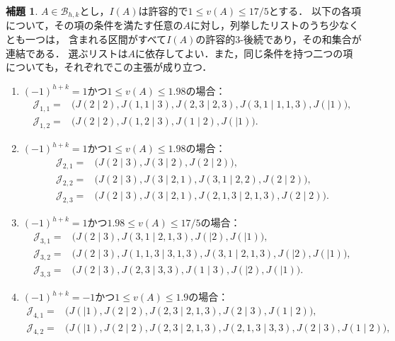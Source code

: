 \documentclass[10pt,a4paper]{ujarticle}
\theoremstyle{definition}
\newtheorem{lemma}{補題}
\begin{document}
\begin{lemma}
  \label{Lem2}
  $A\in\mathcal{B}_{h,k}$とし，$I(A)$は許容的で$1\le v(A)\le17/5$とする．
  以下の各項について，その項の条件を満たす任意の$A$に対し，列挙したリストのうち少なくとも一つは，
  含まれる区間がすべて$I(A)$の許容的$3$-後続であり，その和集合が連結である．
  選ぶリストは$A$に依存してよい．また，同じ条件を持つ二つの項についても，それぞれでこの主張が成り立つ．
  \begin{enumerate}
    \item \label{Lem2:family1} $(-1)^{h+k}=1$かつ$1\le v(A)\le1.98$の場合：
    \[
      \begin{aligned}
        \mathcal{J}_{1,1}={}&\bigl(J(2\mid 2), J(1,1\mid 3), J(2,3\mid 2,3), J(3,1\mid 1,1,3), J(\mid 1)\bigr),\\
        \mathcal{J}_{1,2}={}&\bigl(J(2\mid 2), J(1,2\mid 3), J(1\mid 2), J(\mid 1)\bigr).
      \end{aligned}
    \]
    \item \label{Lem2:family2} $(-1)^{h+k}=1$かつ$1\le v(A)\le1.98$の場合：
    \[
      \begin{aligned}
        \mathcal{J}_{2,1}={}&\bigl(J(2\mid 3), J(3\mid 2), J(2\mid 2)\bigr),\\
        \mathcal{J}_{2,2}={}&\bigl(J(2\mid 3), J(3\mid 2,1), J(3,1\mid 2,2), J(2\mid 2)\bigr),\\
        \mathcal{J}_{2,3}={}&\bigl(J(2\mid 3), J(3\mid 2,1), J(2,1,3\mid 2,1,3), J(2\mid 2)\bigr).
      \end{aligned}
    \]
    \item \label{Lem2:family3} $(-1)^{h+k}=1$かつ$1.98\le v(A)\le17/5$の場合：
    \[
      \begin{aligned}
        \mathcal{J}_{3,1}={}&\bigl(J(2\mid 3), J(3,1\mid 2,1,3), J(\mid 2), J(\mid 1)\bigr),\\
        \mathcal{J}_{3,2}={}&\bigl(J(2\mid 3), J(1,1,3\mid 3,1,3), J(3,1\mid 2,1,3), J(\mid 2), J(\mid 1)\bigr),\\
        \mathcal{J}_{3,3}={}&\bigl(J(2\mid 3), J(2,3\mid 3,3), J(1\mid 3), J(\mid 2), J(\mid 1)\bigr).
      \end{aligned}
    \]
    \item \label{Lem2:family4} $(-1)^{h+k}=-1$かつ$1\le v(A)\le1.9$の場合：
    \[
      \begin{aligned}
        \mathcal{J}_{4,1}={}&\bigl(J(\mid 1), J(2\mid 2), J(2,3\mid 2,1,3), J(2\mid 3), J(1\mid 2)\bigr),\\
        \mathcal{J}_{4,2}={}&\bigl(J(\mid 1), J(2\mid 2), J(2,3\mid 2,1,3), J(2,1,3\mid 3,3), J(2\mid 3), J(1\mid 2)\bigr),\\

\end{aligned}\]
\end{enumerate}
\end{lemma}
\end{document}
